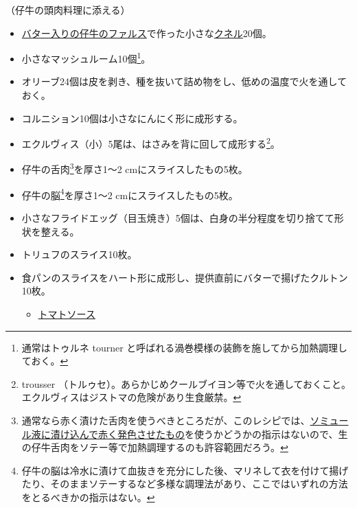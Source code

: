 \begin{recette}


（仔牛の頭肉料理に添える）

\begin{itemize}
\item
  \protect\hyperlink{farce-b}{バター入りの仔牛のファルス}で作った小さな\protect\hyperlink{quenelles}{クネル}20個。
\item
  小さなマッシュルーム10個\footnote{通常はトゥルネ tourner
    と呼ばれる渦巻模様の装飾を施してから加熱調理しておく。}。
\item
  オリーブ24個は皮を剥き、種を抜いて詰め物をし、低めの温度で火を通しておく。
\item
  コルニション10個は小さなにんにく形に成形する。
\item
  エクルヴィス（小）5尾は、はさみを背に回して成形する\footnote{trousser
    （トルゥセ）。あらかじめクールブイヨン等で火を通しておくこと。エクルヴィスはジストマの危険があり生食厳禁。}。
\item
  仔牛の舌肉\footnote{通常なら赤く漬けた舌肉を使うべきところだが、このレシピでは、\protect\hyperlink{saumure-liquide-pour-langues}{ソミュール液に漬け込んで赤く発色させたもの}を使うかどうかの指示はないので、生の仔牛舌肉をソテー等で加熱調理するのも許容範囲だろう。}を厚さ1〜2
  cmにスライスしたもの5枚。
\item
  仔牛の脳\footnote{仔牛の脳は冷水に漬けて血抜きを充分にした後、マリネして衣を付けて揚げたり、そのままソテーするなど多様な調理法があり、ここではいずれの方法をとるべきかの指示はない。}を厚さ1〜2
  cmにスライスしたもの5枚。
\item
  小さなフライドエッグ（目玉焼き）5個は、白身の半分程度を切り捨てて形状を整える。
\item
  トリュフのスライス10枚。
\item
  食パンのスライスをハート形に成形し、提供直前にバターで揚げたクルトン10枚。

  \begin{itemize}
  \tightlist
  \item
    \protect\hyperlink{sauce-tomate}{トマトソース}
  \end{itemize}
\end{itemize}

\atoaki{}


\end{recette}
